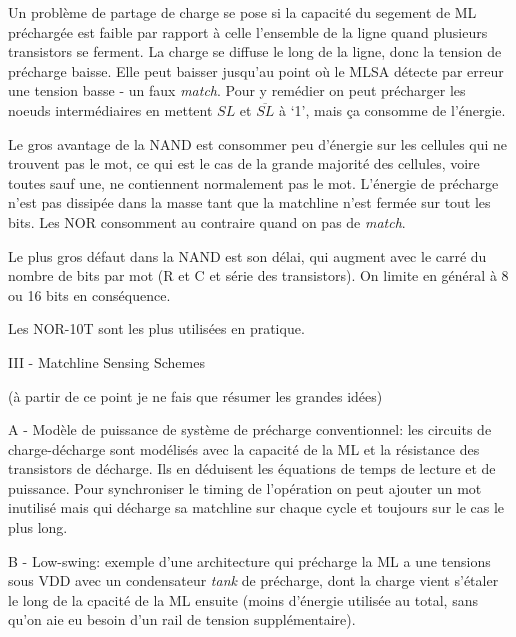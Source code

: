 Un problème de partage de charge se pose si la capacité du segement de ML préchargée est faible par rapport à celle l'ensemble de la ligne quand plusieurs transistors se ferment. La charge se diffuse le long de la ligne, donc la tension de précharge baisse. Elle peut baisser jusqu'au point où le MLSA détecte par erreur une tension basse - un faux \emph{match}. Pour y remédier on peut précharger les noeuds intermédiaires en mettent $SL$ et $\overline{SL}$ à `1', mais ça consomme de l'énergie.

Le gros avantage de la NAND est consommer peu d'énergie sur les cellules qui ne trouvent pas le mot, ce qui est le cas de la grande majorité des cellules, voire toutes sauf une, ne contiennent normalement pas le mot. L'énergie de précharge n'est pas dissipée dans la masse tant que la matchline n'est fermée sur tout les bits. Les NOR consomment au contraire quand on pas de \emph{match}.

Le plus gros défaut dans la NAND est son délai, qui augment avec le carré du nombre de bits par mot (R et C et série des transistors). On limite en général à 8 ou 16 bits en conséquence.

Les NOR-10T sont les plus utilisées en pratique.

III - Matchline Sensing Schemes

(à partir de ce point je ne fais que résumer les grandes idées)


A - Modèle de puissance de système de précharge conventionnel: les circuits de charge-décharge sont modélisés avec la capacité de la ML et la résistance des transistors de décharge. Ils en déduisent les équations de temps de lecture et de puissance. Pour synchroniser le timing de l'opération on peut ajouter un mot inutilisé mais qui décharge sa matchline sur chaque cycle et toujours sur le cas le plus long.

B - Low-swing: exemple d'une architecture qui précharge la ML a une tensions sous VDD avec un condensateur \emph{tank} de précharge, dont la charge vient s'étaler le long de la cpacité de la ML ensuite (moins d'énergie utilisée au total, sans qu'on aie eu besoin d'un rail de tension supplémentaire).

